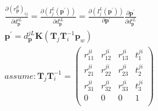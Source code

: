 \documentclass{article}
\begin{document}
\begin{CJK*}{GBK}{song}
\begin{equation}\left.\begin{aligned}
&
\frac{\partial{(r^{d}_{\textbf{p}})_{ij}}}{\partial{d_\textbf{p}^{iL}}} =
\frac{\partial{(I^L_j(\textbf{p}^{'}))}}{\partial{d_\textbf{p}^{iL}}}  =
\frac{\partial{(I^L_j(\textbf{p}^{'}))}}{\partial{\textbf{p}^{'}}}
\frac{\partial{\textbf{p}^{'}}}{\partial{d_\textbf{p}^{iL}}}
\\&
\textbf{p}^{'}=d_\textbf{p}^{jL}\textbf{K}(\textbf{T}_j\textbf{T}_i^{-1}\textbf{p}_w)
\\&
assume:
\textbf{T}_j\textbf{T}_i^{-1}=
\left(
  \begin{array}{cccc}
    r^{ji}_{11} & r^{ji}_{12} & r^{ji}_{13} & t^{ji}_{1} \\
    r^{ji}_{21} & r^{ji}_{22} & r^{ji}_{23} & t^{ji}_{2} \\
    r^{ji}_{31} & r^{ji}_{32} & r^{ji}_{33} & t^{ji}_{3} \\
    0 & 0 & 0 & 1 \\
  \end{array}
\right)
\end{aligned}\tag{2.2}\right.\end{equation}

\end{CJK*}
\end{document}
